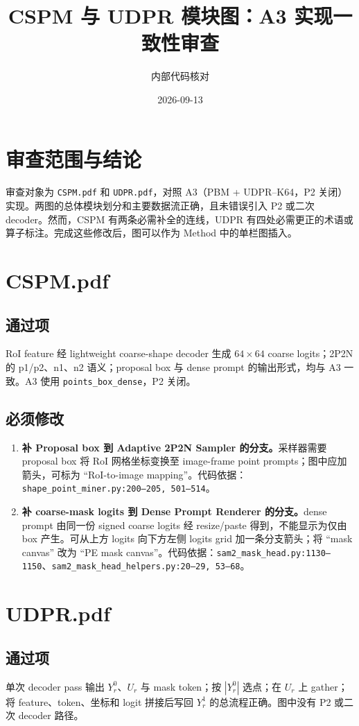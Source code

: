 \documentclass[UTF8,11pt]{ctexart}
\title{CSPM 与 UDPR 模块图：A3 实现一致性审查}
\author{内部代码核对}
\date{2026-09-13}
\begin{document}
\maketitle

\section*{审查范围与结论}
审查对象为 \texttt{CSPM.pdf} 和 \texttt{UDPR.pdf}，对照 A3（PBM + UDPR--K64，P2 关闭）实现。两图的总体模块划分和主要数据流正确，且未错误引入 P2 或二次 decoder。然而，CSPM 有两条必需补全的连线，UDPR 有四处必需更正的术语或算子标注。完成这些修改后，图可以作为 Method 中的单栏图插入。

\section*{CSPM.pdf}
\subsection*{通过项}
RoI feature 经 lightweight coarse-shape decoder 生成 $64\times64$ coarse logits；2P2N 的 p1/p2、n1、n2 语义；proposal box 与 dense prompt 的输出形式，均与 A3 一致。A3 使用 \texttt{points\_box\_dense}，P2 关闭。

\subsection*{必须修改}
\begin{enumerate}
  \item \textbf{补 Proposal box 到 Adaptive 2P2N Sampler 的分支。}采样器需要 proposal box 将 RoI 网格坐标变换至 image-frame point prompts；图中应加箭头，可标为 ``RoI-to-image mapping''。代码依据：\texttt{shape\_point\_miner.py:200--205, 501--514}。
  \item \textbf{补 coarse-mask logits 到 Dense Prompt Renderer 的分支。}dense prompt 由同一份 signed coarse logits 经 resize/paste 得到，不能显示为仅由 box 产生。可从上方 logits 向下方左侧 logits grid 加一条分支箭头；将 ``mask canvas'' 改为 ``PE mask canvas''。代码依据：\texttt{sam2\_mask\_head.py:1130--1150}、\texttt{sam2\_mask\_head\_helpers.py:20--29, 53--68}。
\end{enumerate}

\section*{UDPR.pdf}
\subsection*{通过项}
单次 decoder pass 输出 $Y_r^0$、$U_r$ 与 mask token；按 $|Y_r^0|$ 选点；在 $U_r$ 上 gather；将 feature、token、坐标和 logit 拼接后写回 $Y_r^1$ 的总流程正确。图中没有 P2 或二次 decoder 路径。
\end{document}
